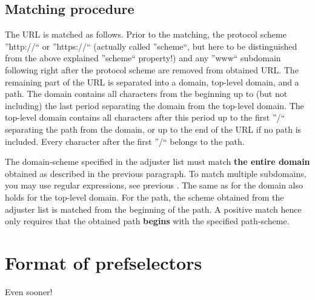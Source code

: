 \documentclass[
a4paper,
12pt,
]
{article}
\begin{document}
 \subsection{Matching procedure}
 The URL is matched as follows. Prior to the matching, the protocol scheme ''http://`` or ''https://`` (actually called ''scheme``, but here to be distinguished from the above explained ''scheme`` property!) and any ''www`` subdomain following right after the protocol scheme are removed from obtained URL. The remaining part of the URL is separated into a domain, top-level domain, and a path. The domain contains all characters from the beginning up to (but not including) the last period separating the domain from the top-level domain. 
 The top-level domain contains all characters after this period up to the first ''/`` separating the path from the domain, or up to the end of the URL if no path is included. Every character after the first ''/`` belongs to the path.\par
 
 The domain-scheme specified in the adjuster list must match \textbf{the entire domain} obtained as described in the previous paragraph. To match multiple subdomains, you may use regular expressions, see previous . The same as for the domain also holds for the top-level domain. For the path, the scheme obtained from the adjuster list is matched from the beginning of the path. A positive match hence only requires that the obtained path \textbf{begins} with the specified path-scheme. 
 
 \section{Format of prefselectors}\label{app_prefselector}

 Even sooner!
 
\end{document}
